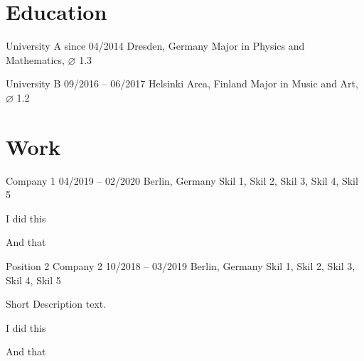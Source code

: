 \header*


\section*{Education}

  {University A}
  {since 04/2014}
  {Dresden, Germany}
  {Major in Physics and Mathematics, $\varnothing$ 1.3}
  {}

  {University B}
  {09/2016 -- 06/2017}
  {Helsinki Area, Finland}
  {Major in Music and Art, $\varnothing$ 1.2}
  {}

\section*{Work}

  {Company 1}
  {04/2019 -- 02/2020}
  {Berlin, Germany}
  {%
    Skil 1,
    Skil 2,
    Skil 3,
    Skil 4,
    Skil 5
  }
  {%
    \begin{cvitems}
      \item {I did this}
      \item {And that}
    \end{cvitems}
  }
\cvEntry
  {Position 2}
  {Company 2}
  {10/2018 -- 03/2019}
  {Berlin, Germany}
  {%
    Skil 1,
    Skil 2,
    Skil 3,
    Skil 4,
    Skil 5
  }
  {%
    Short Description text.
    \begin{cvitems}
      \item {I did this}
      \item {And that}
    \end{cvitems}
  }

